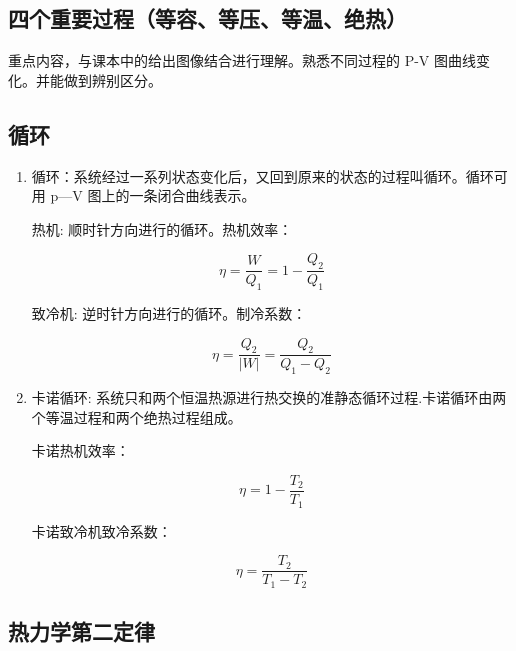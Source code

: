 \subsection{四个重要过程（等容、等压、等温、绝热）}
    
重点内容，与课本中的给出图像结合进行理解。熟悉不同过程的 P-V 图曲线变化。并能做到辨别区分。
    
\subsection{循环}

\begin{enumerate}
    \item 循环：系统经过一系列状态变化后，又回到原来的状态的过程叫循环。循环可用 p—V 图上的一条闭合曲线表示。
    
    热机: 顺时针方向进行的循环。热机效率：
    
    $$ \eta = \frac{W}{Q_1} = 1 - \frac{Q_2}{Q_1} $$
    
    致冷机: 逆时针方向进行的循环。制冷系数：

    $$ \eta = \frac{Q_2}{|W|} = \frac{Q_2}{Q_1 - Q_2} $$
    
    \item 卡诺循环: 系统只和两个恒温热源进行热交换的准静态循环过程.卡诺循环由两个等温过程和两个绝热过程组成。
    
    卡诺热机效率：
    
    $$ \eta = 1 - \frac{T_2}{T_1} $$
    
    卡诺致冷机致冷系数：
    
    $$ \eta = \frac{T_2}{T_1 - T_2} $$

\end{enumerate}

\subsection{热力学第二定律}


